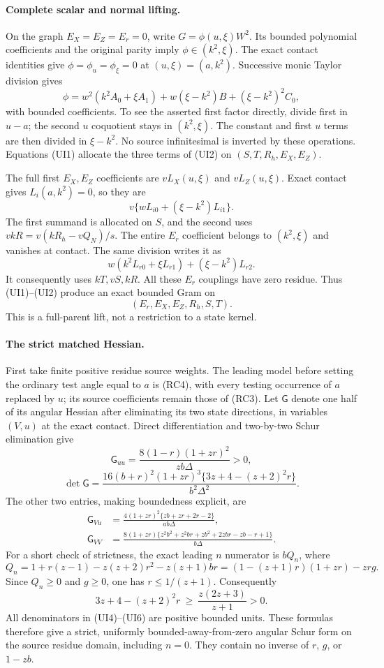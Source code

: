 \paragraph{Complete scalar and normal lifting.}
On the graph $E_X=E_Z=E_r=0$, write $G=\phi(u,\xi)W^2$.
Its bounded polynomial coefficients and the original parity imply
$\phi\in(k^2,\xi)$. The exact contact identities give
$\phi=\phi_u=\phi_\xi=0$ at $(u,\xi)=(a,k^2)$.
Successive monic Taylor division gives
\[
 \phi=w^2(k^2A_0+\xi A_1)
             +w(\xi-k^2)B+(\xi-k^2)^2C_0,          \tag{UI2}
\]
with bounded coefficients. To see the asserted first factor directly,
divide first in $u-a$; the second $u$ coquotient stays in
$(k^2,\xi)$. The constant and first $u$ terms are then divided in
$\xi-k^2$. No source infinitesimal is inverted by these operations.
Equations (UI1) allocate the three terms of (UI2) on
$(S,T,R_h,E_X,E_Z)$.

The full first $E_X,E_Z$ coefficients are $vL_X(u,\xi)$ and
$vL_Z(u,\xi)$. Exact contact gives $L_i(a,k^2)=0$, so they are
\[
 v\{wL_{i0}+(\xi-k^2)L_{i1}\}.
\]
The first summand is allocated on $S$, and the second uses
$vkR=v(kR_h-vQ_N)/s$. The entire $E_r$ coefficient belongs to
$(k^2,\xi)$ and vanishes at contact. The same division writes it as
\[
 w(k^2L_{r0}+\xi L_{r1})+(\xi-k^2)L_{r2}.
\]
It consequently uses $kT,vS,kR$. All these $E_r$ couplings have
zero residue. Thus (UI1)--(UI2) produce an exact bounded Gram on
\[
             (E_r,E_X,E_Z,R_h,S,T).                 \tag{UI3}
\]
This is a full-parent lift, not a restriction to a state kernel.

\paragraph{The strict matched Hessian.}
First take finite positive residue source weights. The leading model
before setting the ordinary test angle equal to $a$ is (RC4), with
every testing occurrence of $a$ replaced by $u$; its source
coefficients remain those of (RC3). Let $\mathsf G$ denote one half
of its angular Hessian after eliminating its two state directions,
in variables $(V,u)$ at the exact contact. Direct differentiation and
two-by-two Schur elimination give
\[
 \mathsf G_{uu}=
 \frac{8(1-r)(1+zr)^2}{zb\Delta}>0,                 \tag{UI4}
\]
\[
 \det\mathsf G=
 \frac{16(b+r)^2(1+zr)^3
                \{3z+4-(z+2)^2r\}}{b^2\Delta^2}.  \tag{UI5}
\]
The other two entries, making boundedness explicit, are
\begin{align*}
 \mathsf G_{Vu}&=
 \frac{4(1+zr)^2\{zb+zr+2r-2\}}{ab\Delta},\\
 \mathsf G_{VV}&=
 \frac{8(1+zr)\{z^2b^2+z^2br+zb^2+2zbr-zb-r+1\}}
      {b\Delta}.
\end{align*}
For a short check of strictness, the exact leading $n$ numerator is
$bQ_n$, where
\[
 Q_n=1+r(z-1)-z(z+2)r^2-z(z+1)br
     =(1-(z+1)r)(1+zr)-zr g.
\]
Since $Q_n\ge0$ and $g\ge0$, one has $r\le1/(z+1)$.
Consequently
\[
 3z+4-(z+2)^2r\ \ge\ \frac{z(2z+3)}{z+1}>0.       \tag{UI6}
\]
All denominators in (UI4)--(UI6) are positive bounded units.
These formulas therefore give a strict, uniformly bounded-away-from-zero
angular Schur form on the source residue domain, including $n=0$.
They contain no inverse of $r$, $g$, or $1-zb$.

